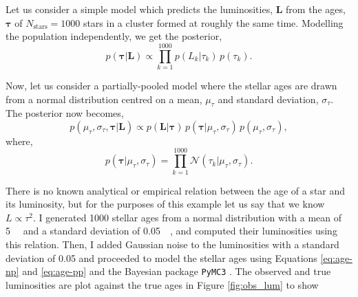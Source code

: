 Let us consider a simple model which predicts the luminosities, $\bm{L}$ from the ages, $\bm{\tau}$ of $N_\mathrm{stars} = 1000$ stars in a cluster formed at roughly the same time. Modelling the population independently, we get the posterior,
%
\begin{equation}
    p(\bm{\tau} | \bm{L}) \propto \prod_{k=1}^{1000} p(L_k | \tau_k) \, p(\tau_k).
    \label{eq:age-np}
\end{equation}
%

Now, let us consider a partially-pooled model where the stellar ages are drawn from a normal distribution centred on a mean, $\mu_\tau$ and standard deviation, $\sigma_\tau$. The posterior now becomes,
%
\begin{equation}
    p(\mu_\tau, \sigma_\tau, \bm{\tau} | \bm{L}) \propto p(\bm{L} | \bm{\tau}) \, p(\bm{\tau} | \mu_\tau, \sigma_\tau) \, p(\mu_\tau, \sigma_\tau),
    \label{eq:age-pp}
\end{equation}
%
where,
%
\begin{equation}
    p(\bm{\tau} | \mu_\tau, \sigma_\tau) = \prod_{k=1}^{1000} \mathcal{N}(\tau_k | \mu_\tau, \sigma_\tau).
\end{equation}

There is no known analytical or empirical relation between the age of a star and its luminosity, but for the purposes of this example let us say that we know $L \propto \tau^{2}$. I generated 1000 stellar ages from a normal distribution with a mean of \SI{5}{\giga\year} and a standard deviation of \SI{0.05}{\giga\year}, and computed their luminosities using this relation. Then, I added Gaussian noise to the luminosities with a standard deviation of \SI{0.05}{\solarluminosity} and proceeded to model the stellar ages using Equations \ref{eq:age-np} and \ref{eq:age-pp} and the Bayesian package \texttt{PyMC3} \citep{Salvatier.Wiecki.ea2016}. The observed and true luminosities are plot against the true ages in Figure \ref{fig:obs_lum} to show

